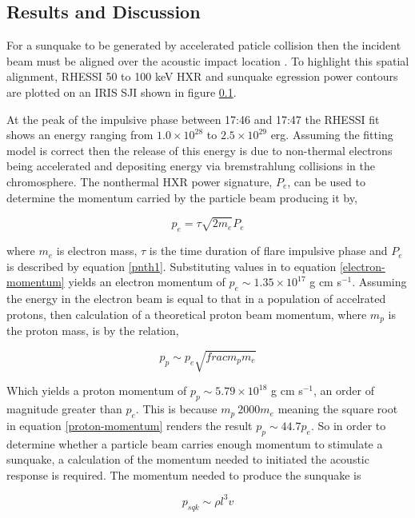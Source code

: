 \subsection{Results and Discussion}
For a sunquake to be generated by accelerated paticle collision then the incident beam must be aligned over the acoustic impact location \citep{}. To highlight this spatial alignment, RHESSI 50 to 100 keV HXR and sunquake egression power contours are plotted on an IRIS SJI shown in figure \ref{}. %

At the peak of the impulsive phase between 17:46 and 17:47 the RHESSI fit shows an energy ranging from $1.0{\times}10^{28}$ to $2.5{\times}10^{29}$ erg. Assuming the fitting model is correct then the release of this energy is due to non-thermal electrons being accelerated and depositing energy via bremstrahlung collisions in the chromosphere. The nonthermal HXR power signature, $P_e$, can be used to determine the momentum carried by the particle beam producing it by,

\begin{equation}\label{electron-momentum}
p_e=\tau \sqrt{2m_e} P_{e}
\end{equation}

where $m_e$ is electron mass, $\tau$ is the time duration of flare impulsive phase and $P_{e}$ is described by equation \ref{pnth1}. Substituting values in to equation \ref{electron-momentum} yields an electron momentum of $p_e \sim 1.35{\times}10^{17}$ g cm s$^{-1}$. Assuming the energy in the electron beam is equal to that in a population of accelrated protons, then calculation of a theoretical proton beam momentum, where $m_p$ is the proton mass, is by the relation,

\begin{equation}\label{proton-momentum}
p_p \sim p_e \sqrt{frac{m_p}{m_e}}
\end{equation}

Which yields a proton momentum of $p_p \sim 5.79{\times}10^18$ g cm s$^{-1}$, an order of magnitude greater than $p_e$. This is because $m_p ~ 2000m_e$ meaning the square root in equation \ref{proton-momentum} renders the result $p_p \sim 44.7p_e$. So in order to determine whether a particle beam carries enough momentum to stimulate a sunquake, a calculation of the momentum needed to initiated the acoustic response is required. The momentum needed to produce the sunquake is

\begin{equation}\label{sqk-momentum}
p_{sqk}\sim \rho l^{3} v
\end{equation} 

